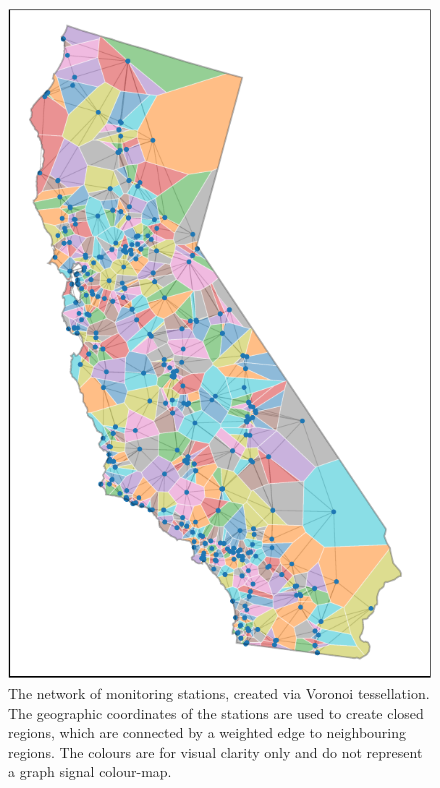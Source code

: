 \begin{figure}[h]
    \centering
    \vspace*{3cm}
    \includegraphics[width=0.65\linewidth]{Figures/cali_plot2.pdf}
    \vspace*{0.3cm}
    \caption[The network of monitoring stations created via Voronoi tessellation]{The network of monitoring stations, created via Voronoi tessellation. The geographic coordinates of the stations are used to create closed regions, which are connected by a weighted edge to neighbouring regions. The colours are for visual clarity only and do not represent a graph signal colour-map. }
    \label{fig:cali_voronoi}
\end{figure}

\FloatBarrier

